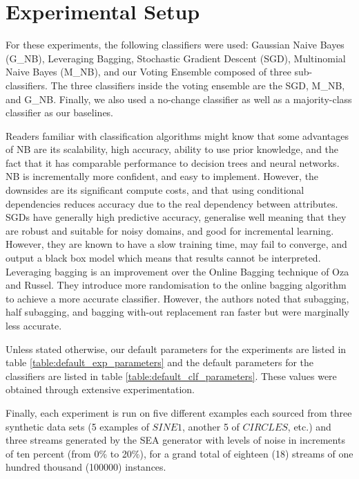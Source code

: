 \section{Experimental Setup}
For these experiments, the following classifiers were used: Gaussian Naive Bayes (G\_NB), Leveraging Bagging, Stochastic Gradient Descent (SGD), Multinomial Naive Bayes (M\_NB), and our Voting Ensemble composed of three sub-classifiers. The three classifiers inside the voting ensemble are the SGD, M\_NB, and G\_NB. Finally, we also used a no-change classifier as well as a majority-class classifier as our baselines.

Readers familiar with classification algorithms \cite{viktor2015course} might know that some advantages of NB are its scalability, high accuracy, ability to use prior knowledge, and the fact that it has comparable performance to decision trees and neural networks. NB is incrementally more confident, and easy to implement. However, the downsides are its significant compute costs, and that using conditional dependencies reduces accuracy due to the real dependency between attributes.
SGDs have generally high predictive accuracy, generalise well meaning that they are robust and suitable for noisy domains, and good for incremental learning. However, they are known to have a slow training time, may fail to converge, and output a black box model which means that results cannot be interpreted.
Leveraging bagging \cite{bifet2010leveraging} is an improvement over the Online Bagging technique of Oza and Russel. They introduce more randomisation to the online bagging algorithm to achieve a more accurate classifier. However, the authors noted that subagging, half subagging, and bagging with-out replacement ran faster but were marginally less accurate.

Unless stated otherwise, our default parameters for the experiments are listed in table \ref{table:default_exp_parameters} and the default parameters for the classifiers are listed in table \ref{table:default_clf_parameters}. These values were obtained through extensive experimentation.

Finally, each experiment is run on five different examples each sourced from three synthetic data sets (5 examples of $SINE1$, another 5 of $CIRCLES$, etc.) and three streams generated by the SEA generator with levels of noise in increments of ten percent (from 0\% to 20\%), for a grand total of eighteen (18) streams of one hundred thousand (100000) instances.

